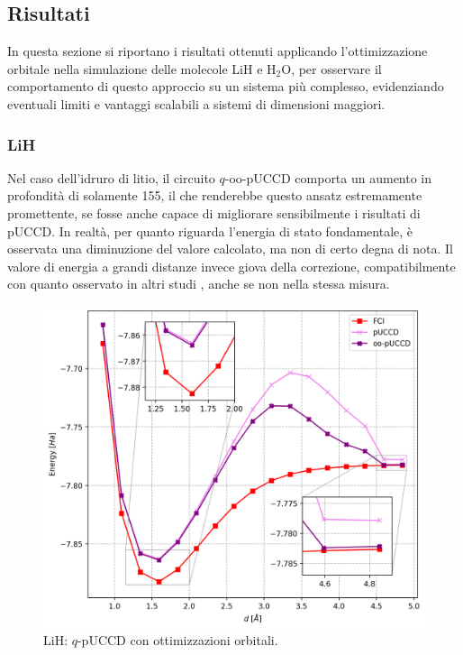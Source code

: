 \subsection{Risultati}\label{sez:risultati-oo-pUCCD}

In questa sezione si riportano i risultati ottenuti applicando l’ottimizzazione orbitale nella simulazione delle molecole LiH e H$_2$O, per osservare il comportamento di questo approccio su un sistema più complesso, evidenziando eventuali limiti e vantaggi scalabili a sistemi di dimensioni maggiori.

\subsubsection{LiH}

Nel caso dell'idruro di litio, il circuito $q$-oo-pUCCD comporta un aumento in profondità di solamente 155, il che renderebbe questo ansatz estremamente promettente, se fosse anche capace di migliorare sensibilmente i risultati di pUCCD. In realtà, per quanto riguarda l'energia di stato fondamentale, è osservata una diminuzione del valore calcolato, ma non di certo degna di nota. Il valore di energia a grandi distanze invece giova della correzione, compatibilmente con quanto osservato in altri studi \cite{Sokolov_2020,Zhao_2023}, anche se non nella stessa misura.

\begin{figure}[H]
    \centering
    \hspace{-1cm}
    \includegraphics[width=.6\linewidth]{Immagini/Capitolo_3/LiH_oo_pUCCD.png}
    \caption{LiH: $q$-pUCCD con ottimizzazioni orbitali.}
    \label{fig:LiH-ottimizzazioni-orbitali}
\end{figure}

